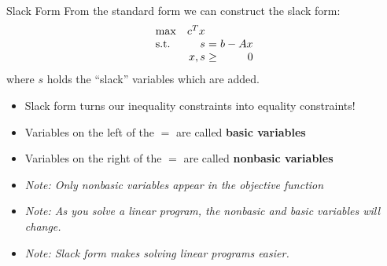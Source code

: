 \documentclass{beamer}
\begin{document}
\begin{frame}{Slack Form}
    From the standard form we can construct the slack form: 
    \begin{equation*}
    \setlength\arraycolsep{1.5pt}
      \begin{array}{l@{\quad} r c r} 
        \max          & c^{T}x & & \\
        \mathrm{s.t.} &  s & = & b - Ax \\
                      & x, s & \geq &  0 \\
      \end{array}
    \end{equation*}
    where $s$ holds the ``slack'' variables which are added. 
    \pause
    \begin{itemize}
        \item Slack form turns our inequality constraints into equality constraints! \pause
        \item Variables on the left of the $=$ are called \textbf{basic variables} \pause
        \item Variables on the right of the $=$ are called \textbf{nonbasic variables} \pause
        \item \textit{Note: Only nonbasic variables appear in the objective function} \pause
        \item \textit{Note: As you solve a linear program, the nonbasic and basic variables will change.} \pause
        \item \textit{Note: Slack form makes solving linear programs easier.}
    \end{itemize}
\end{frame}
\end{document}

